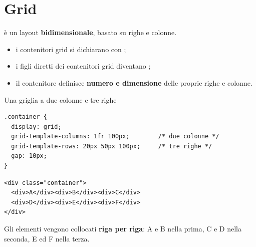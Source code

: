 
\section{Grid}

 è un layout \textbf{bidimensionale}, basato su righe e colonne.

\begin{itemize}
  \item i contenitori grid si dichiarano con ;
  \item i figli diretti dei contenitori grid diventano ;
  \item il contenitore definisce \textbf{numero e dimensione} delle proprie
        righe e colonne.
\end{itemize}

\begin{esempio}{Una griglia a due colonne e tre righe}
\begin{affianco}[0.55]
\begin{lstlisting}[style=css, name=grid.css]
.container {
  display: grid;
  grid-template-columns: 1fr 100px;        /* due colonne */
  grid-template-rows: 20px 50px 100px;     /* tre righe */
  gap: 10px;
}
\end{lstlisting}

\begin{lstlisting}[style=html, name=grid.html]
<div class="container">
  <div>A</div><div>B</div><div>C</div>
  <div>D</div><div>E</div><div>F</div>
</div>
\end{lstlisting}

\risultato
\begin{browser}
\end{browser}
\end{affianco}

Gli elementi vengono collocati \textbf{riga per riga}: A e B nella prima, C e D
nella seconda, E ed F nella terza.
\end{esempio}

